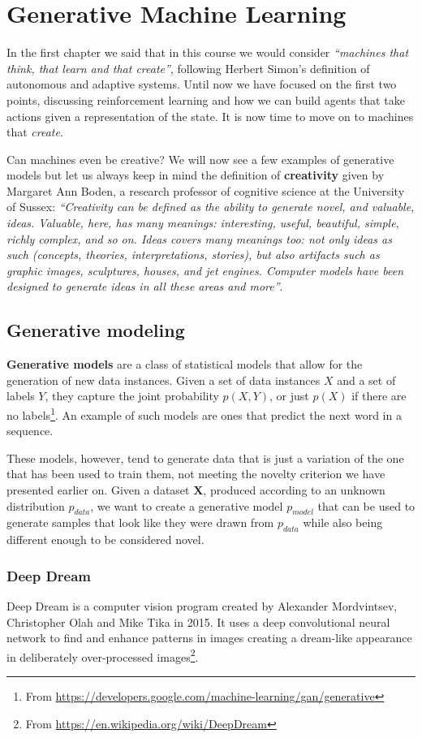 \chapter{Generative Machine Learning}
In the first chapter we said that in this course we would consider \textit{``machines that think, that learn and that create''}, following Herbert Simon’s definition of autonomous and adaptive systems. Until now we have focused on the first two points, discussing reinforcement learning and how we can build agents that take actions given a representation of the state. It is now time to move on to machines that \textit{create}.

Can machines even be creative? We will now see a few examples of generative models but let us always keep in mind the definition of \textbf{creativity} given by Margaret Ann Boden, a research professor of cognitive science at the University of Sussex: \textit{``Creativity can be defined as the ability to generate novel, and valuable, ideas. Valuable, here, has many meanings: interesting, useful, beautiful, simple, richly complex, and so on. Ideas covers many meanings too: not only ideas as such (concepts, theories, interpretations, stories), but also artifacts such as graphic images, sculptures, houses, and jet engines. Computer models have been designed to generate ideas in all these areas and more''}.

\section{Generative modeling}
\textbf{Generative models} are a class of statistical models that allow for the generation of new data instances. Given a set of data instances $X$ and a set of labels $Y$, they capture the joint probability $p(X,Y)$, or just $p(X)$ if there are no labels\footnote{From \url{https://developers.google.com/machine-learning/gan/generative}}. An example of such models are ones that predict the next word in a sequence. 

These models, however, tend to generate data that is just a variation of the one that has been used to train them, not meeting the novelty criterion we have presented earlier on. Given a dataset $\boldsymbol{X}$, produced according to an unknown distribution $p_{data}$, we want to create a generative model $p_{model}$ that can be used to generate samples that look like they were drawn from $p_{data}$ while also being different enough to be considered novel.

\subsection{Deep Dream}
Deep Dream is a computer vision program created by Alexander Mordvintsev, Christopher Olah and Mike Tika in 2015. It uses a deep convolutional neural network to find and enhance patterns in images creating a dream-like appearance in deliberately over-processed images\footnote{From \url{https://en.wikipedia.org/wiki/DeepDream}}.

